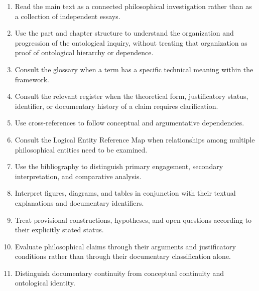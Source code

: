 \begin{enumerate}
    \item Read the main text as a connected
    philosophical investigation rather than
    as a collection of independent essays.

    \item Use the part and chapter structure
    to understand the organization and progression
    of the ontological inquiry, without treating
    that organization as proof of ontological
    hierarchy or dependence.

    \item Consult the glossary when a term
    has a specific technical meaning within
    the framework.

    \item Consult the relevant register when
    the theoretical form, justificatory status,
    identifier, or documentary history of
    a claim requires clarification.

    \item Use cross-references to follow
    conceptual and argumentative dependencies.

    \item Consult the Logical Entity Reference
    Map when relationships among multiple
    philosophical entities need to be examined.

    \item Use the bibliography to distinguish
    primary engagement, secondary interpretation,
    and comparative analysis.

    \item Interpret figures, diagrams, and
    tables in conjunction with their textual
    explanations and documentary identifiers.

    \item Treat provisional constructions,
    hypotheses, and open questions according
    to their explicitly stated status.

    \item Evaluate philosophical claims through
    their arguments and justificatory conditions
    rather than through their documentary
    classification alone.

    \item Distinguish documentary continuity
    from conceptual continuity and ontological
    identity.

\end{enumerate}


